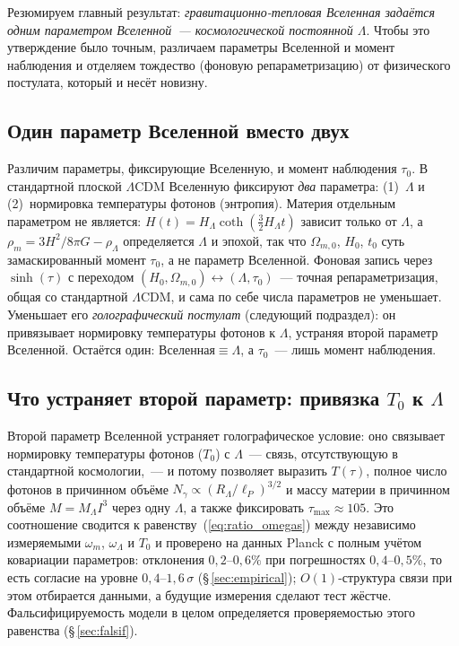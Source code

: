 \documentclass[12pt,a4paper]{article}
\begin{document}
Резюмируем главный результат: \emph{гравитационно-тепловая Вселенная задаётся одним параметром Вселенной~--- космологической постоянной $\Lambda$}. Чтобы это утверждение было точным, различаем параметры Вселенной и момент наблюдения и отделяем тождество (фоновую репараметризацию) от физического постулата, который и несёт новизну.

\subsection{Один параметр Вселенной вместо двух}

Различим параметры, фиксирующие Вселенную, и момент наблюдения $\tau_0$. В стандартной плоской $\Lambda$CDM Вселенную фиксируют \emph{два} параметра: (1)~$\Lambda$ и (2)~нормировка температуры фотонов (энтропия). Материя отдельным параметром не является: $H(t)=H_\Lambda\coth(\tfrac32 H_\Lambda t)$ зависит только от $\Lambda$, а $\rho_m=3H^2/8\pi G-\rho_\Lambda$ определяется $\Lambda$ и эпохой, так что $\Omega_{m,0}$, $H_0$, $t_0$ суть замаскированный момент $\tau_0$, а не параметр Вселенной. Фоновая запись через $\sinh(\tau)$ с переходом $(H_0,\Omega_{m,0})\leftrightarrow(\Lambda,\tau_0)$~--- точная репараметризация, общая со стандартной $\Lambda$CDM, и сама по себе числа параметров не уменьшает. Уменьшает его \emph{голографический постулат} (следующий подраздел): он привязывает нормировку температуры фотонов к $\Lambda$, устраняя второй параметр Вселенной. Остаётся один: $\text{Вселенная}\equiv\Lambda$, а $\tau_0$~--- лишь момент наблюдения.

\subsection{Что устраняет второй параметр: привязка $T_0$ к $\Lambda$}

Второй параметр Вселенной устраняет голографическое условие: оно связывает нормировку температуры фотонов ($T_0$) с $\Lambda$~--- связь, отсутствующую в стандартной космологии,~--- и потому позволяет выразить $T(\tau)$, полное число фотонов в причинном объёме $N_\gamma\propto(R_\Lambda/\ell_P)^{3/2}$ и массу материи в причинном объёме $M=M_\Lambda I^3$ через одну $\Lambda$, а также фиксировать $\tau_{\max}\approx105$. Это соотношение сводится к равенству~(\ref{eq:ratio_omegas}) между независимо измеряемыми $\omega_m$, $\omega_\Lambda$ и $T_0$ и проверено на данных Planck с полным учётом ковариации параметров: отклонения $0{,}2$--$0{,}6\%$ при погрешностях $0{,}4$--$0{,}5\%$, то есть согласие на уровне $0{,}4$--$1{,}6\,\sigma$ (\S\,\ref{sec:empirical}); $O(1)$-структура связи при этом отбирается данными, а будущие измерения сделают тест жёстче. Фальсифицируемость модели в целом определяется проверяемостью этого равенства (\S\,\ref{sec:falsif}).
\end{document}
